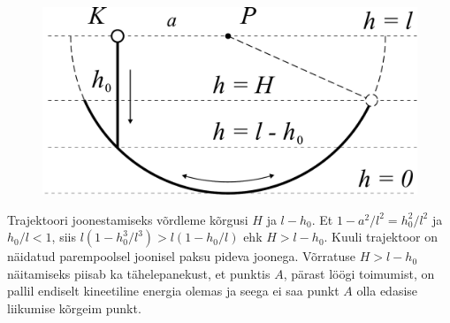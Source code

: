 \begin{figure}
\vspace{-1cm}
  \begin{center}
    \includegraphics[width=1\linewidth]{2024-v2g-06-yl2.pdf}
  \end{center}
  \vspace{-1.0cm}
\end{figure}

Trajektoori joonestamiseks võrdleme kõrgusi $H$ ja $l-h_0$. Et $1-a^2/l^2=h_0^2/l^2$ ja $h_0/l<1$, siis
$l(1-h_0^3/l^3)>l(1-h_0/l)$
ehk $H>l-h_0$.
Kuuli trajektoor on näidatud parempoolsel joonisel paksu pideva joonega. Võrratuse $H>l-h_0$ näitamiseks piisab ka tähelepanekust, et punktis $A$, pärast löögi toimumist, on pallil endiselt kineetiline energia olemas ja seega ei saa punkt $A$ olla edasise liikumise kõrgeim punkt.
\probend